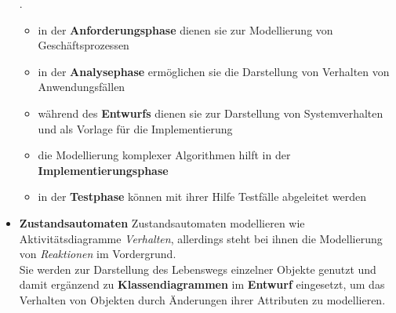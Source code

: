\begin{itemize}
{    }.\\
    \begin{itemize}
        \item in der \textbf{Anforderungsphase} dienen sie zur Modellierung von Geschäftsprozessen
        \item in der \textbf{Analysephase} ermöglichen sie die Darstellung von Verhalten von Anwendungsfällen
        \item während des \textbf{Entwurfs} dienen sie zur Darstellung von Systemverhalten und als Vorlage für die Implementierung
        \item die Modellierung komplexer Algorithmen hilft in der \textbf{Implementierungsphase}
        \item in der \textbf{Testphase} können mit ihrer Hilfe Testfälle abgeleitet werden
    \end{itemize}
    \item \textbf{Zustandsautomaten} Zustandsautomaten modellieren wie Aktivitätsdiagramme \textit{Verhalten}, allerdings steht bei ihnen die Modellierung von \textit{Reaktionen} im Vordergrund.\\
    Sie werden zur Darstellung des Lebenswegs einzelner Objekte genutzt und damit ergänzend zu \textbf{Klassendiagrammen} im \textbf{Entwurf} eingesetzt, um das Verhalten von Objekten durch Änderungen ihrer Attributen zu modellieren.
\end{itemize}

